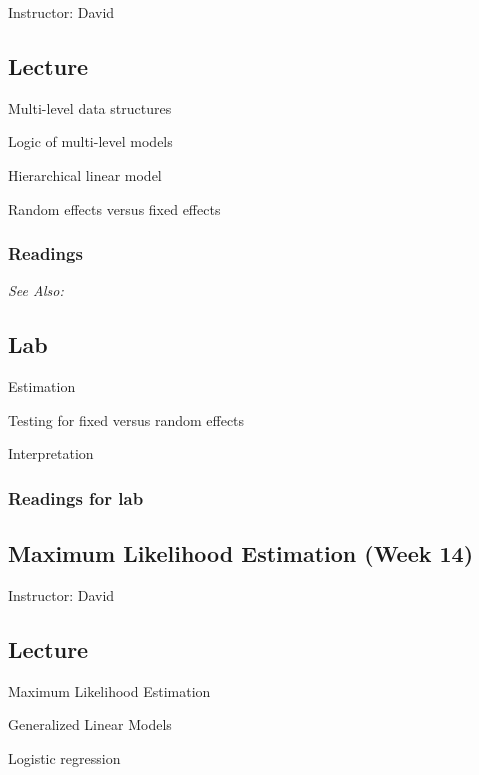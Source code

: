\documentclass[11pt,a4paper]{article}
\newcommand{\david}{\vspace{1em}\noindent Instructor: David\vspace{1em}\\}
\newcommand{\seealso}{\noindent \emph{See Also:}\\}
\begin{document}
\david

\subsection*{Lecture}
\begin{itemize*}
\item Multi-level data structures
\item Logic of multi-level models
\item Hierarchical linear model
\item Random effects versus fixed effects
\end{itemize*}

\subsubsection*{Readings}

\seealso


\subsection*{Lab}

\begin{itemize*}
\item Estimation
\item Testing for fixed versus random effects
\item Interpretation
\end{itemize*}

\subsubsection*{Readings for lab}


\clearpage
\subsection{Maximum Likelihood Estimation (Week 14)} %
\emph{}

\david

\subsection*{Lecture}
\begin{itemize*}
\item Maximum Likelihood Estimation
\item Generalized Linear Models
\item Logistic regression
\end{itemize*}
\end{document}
